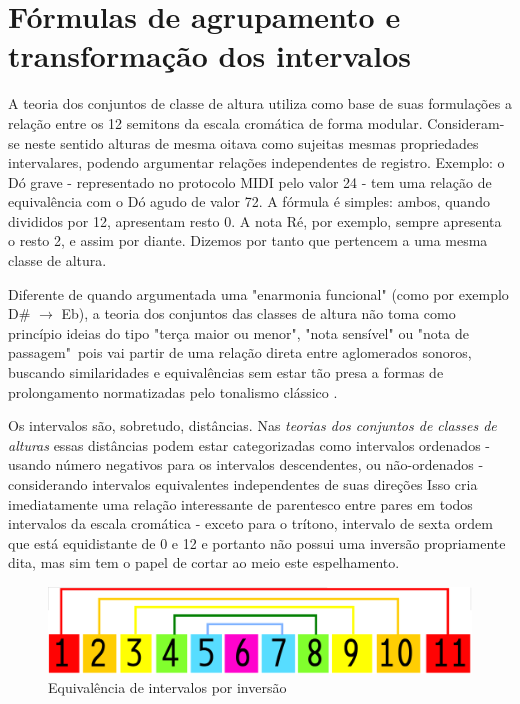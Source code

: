 \documentclass[
	12pt,				%
	openright,			%
	twoside,			%
	a4paper,			%
	english,			%
	french,				%
	spanish,			%
	brazil				%
	]{abntex2}
\begin{document}
\section{Fórmulas de agrupamento e transformação dos intervalos}

A teoria dos conjuntos de classe de altura utiliza como base de suas formulações a relação entre os 12 semitons da escala cromática de forma modular. Consideram-se neste sentido alturas de mesma oitava como sujeitas mesmas propriedades intervalares, podendo argumentar relações independentes de registro. Exemplo: o Dó grave - representado no protocolo MIDI pelo valor 24 - tem uma relação de equivalência com o Dó agudo de valor 72. A fórmula é simples: ambos, quando divididos por 12, apresentam resto 0. A nota Ré, por exemplo, sempre apresenta o resto 2, e assim por diante. Dizemos por tanto que pertencem a uma mesma classe de altura.

Diferente de quando argumentada uma "enarmonia funcional" \cite{temperley2001cognition} (como por exemplo D\# $\to$ Eb), a teoria dos conjuntos das classes de altura não toma como princípio ideias do tipo "terça maior ou menor", "nota sensível" ou "nota de passagem"\ pois vai partir de uma relação direta entre aglomerados sonoros, buscando similaridades e equivalências sem estar tão presa a formas de prolongamento normatizadas pelo tonalismo clássico \cite{lerdahl1989atonal,straus1987problem}.

Os intervalos são, sobretudo, distâncias. Nas \textit{teorias dos conjuntos de classes de alturas} essas distâncias podem estar categorizadas como intervalos ordenados - usando número negativos para os intervalos descendentes, ou não-ordenados - considerando intervalos equivalentes independentes de suas direções \cite[p. 6]{straus2004} Isso cria imediatamente uma relação interessante de parentesco entre pares em todos intervalos da escala cromática - exceto para o trítono, intervalo de sexta ordem que está equidistante de 0 e 12 e portanto não possui uma inversão propriamente dita, mas sim tem o papel de cortar ao meio este espelhamento.

\begin{figure}[!h]
	\caption{\label{fig_grafico}Equivalência de intervalos por inversão }
	\begin{center}
	    \includegraphics[scale=0.3]{algo/equivalencia_inversa.png}
	\end{center}
\end{figure}
\end{document}

